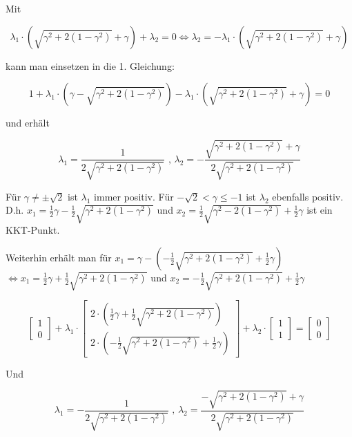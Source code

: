 \documentclass[a4paper, 12pt]{report}
\begin{document}
Mit

$$\lambda_1 \cdot \left(\sqrt{\gamma^2 + 2(1 - \gamma^2)} + \gamma\right) + \lambda_2 = 0 \Leftrightarrow \lambda_2 = -\lambda_1 \cdot \left(\sqrt{\gamma^2 + 2(1 - \gamma^2)} + \gamma\right)$$

kann man einsetzen in die 1. Gleichung:

$$1 + \lambda_1\cdot \left(\gamma - \sqrt{\gamma^2 + 2(1 - \gamma^2)}\right) - \lambda_1\cdot \left(\sqrt{\gamma^2 + 2(1 - \gamma^2)} + \gamma\right) = 0$$

und erhält

$$\lambda_1 = \frac{1}{2\sqrt{\gamma^2 + 2(1 - \gamma^2)}} \text{ , } \lambda_2 = - \frac{\sqrt{\gamma^2 + 2(1 - \gamma^2)} + \gamma}{2\sqrt{\gamma^2 + 2(1 - \gamma^2)}}$$

Für $\gamma \neq \pm \sqrt{2}$ ist $\lambda_1$ immer positiv. Für $-\sqrt{2} < \gamma \leq -1$ ist $\lambda_2$ ebenfalls positiv.
D.h. $x_1 = \frac{1}{2}\gamma - \frac{1}{2}\sqrt{\gamma^2 + 2(1 - \gamma^2)}$ und $x_2 = \frac{1}{2}\sqrt{\gamma^2 - 2(1 - \gamma^2)} + \frac{1}{2}\gamma$ ist ein KKT-Punkt.

Weiterhin erhält man für $x_1 = \gamma - \left(-\frac{1}{2}\sqrt{\gamma^2 + 2(1 - \gamma^2)} + \frac{1}{2}\gamma\right)$\\
$\Leftrightarrow x_1 = \frac{1}{2}\gamma + \frac{1}{2}\sqrt{\gamma^2 + 2(1 - \gamma^2)}$ und $x_2 = - \frac{1}{2}\sqrt{\gamma^2 + 2(1 - \gamma^2)} + \frac{1}{2}\gamma$

$$\begin{bmatrix}1\\0\end{bmatrix} + \lambda_1 \cdot \begin{bmatrix}2\cdot \left(\frac{1}{2}\gamma + \frac{1}{2}\sqrt{\gamma^2 + 2(1 - \gamma^2)}\right)\\2\cdot \left(-\frac{1}{2}\sqrt{\gamma^2 + 2(1-\gamma^2)} + \frac{1}{2}\gamma\right)\end{bmatrix} + \lambda_2 \cdot \begin{bmatrix}1\\1\end{bmatrix} =\begin{bmatrix}0\\0\end{bmatrix}$$

Und

$$\lambda_1 = - \frac{1}{2\sqrt{\gamma^2 + 2(1 - \gamma^2)}} \text{ , } \lambda_2 = \frac{-\sqrt{\gamma^2 + 2(1 - \gamma^2)} + \gamma}{2\sqrt{\gamma^2 + 2(1 - \gamma^2)}}$$
\end{document}
